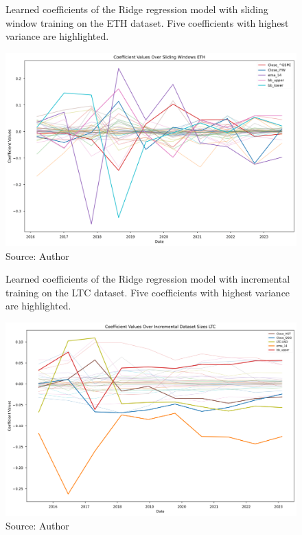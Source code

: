 \begin{figure}[!h]
    \centering
    \caption{Learned coefficients of the Ridge regression model
    with sliding window training on the ETH dataset. Five 
    coefficients with highest variance are highlighted.}
    \includegraphics[width=1\textwidth]{Figures/coefficient_values_sliding_eth.png}
    \caption*{Source: Author}
    \label{fig:coefs_sliding_eth}
\end{figure}

\begin{figure}[!h]
    \centering
    \caption{Learned coefficients of the Ridge regression model
    with incremental training on the LTC dataset. Five 
    coefficients with highest variance are highlighted.}
    \includegraphics[width=1\textwidth]{Figures/coefficient_values_incremental_ltc.png}
    \caption*{Source: Author}
    \label{fig:coefs_incremental_ltc}
\end{figure}

